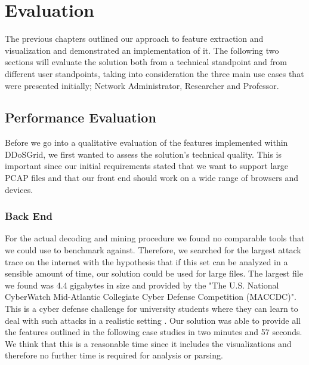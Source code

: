 




\chapter{Evaluation}

The previous chapters outlined our approach to feature extraction and visualization and demonstrated an implementation of it. The following two sections will evaluate the solution both from a technical standpoint and from different user standpoints, taking into consideration the three main use cases that were presented initially; Network Administrator, Researcher and Professor.
\section{Performance Evaluation}
Before we go into a qualitative evaluation of the features implemented within DDoSGrid, we first wanted to assess the solution's technical quality. This is important since our initial requirements stated that we want to support large PCAP files and that our front end should work on a wide range of browsers and devices.
\subsection{Back End}
For the actual decoding and mining procedure we found no comparable tools that we could use to benchmark against. Therefore, we searched for the largest attack trace on the internet with the hypothesis that if this set can be analyzed in a sensible amount of time, our solution could be used for large files. The largest file we found was 4.4 gigabytes in size and provided by the "The U.S. National CyberWatch Mid-Atlantic Collegiate Cyber Defense Competition (MACCDC)". This is a cyber defense challenge for university students where they can learn to deal with such attacks in a realistic setting \cite{maccdc}.
Our solution was able to provide all the features outlined in the following case studies in two minutes and 57 seconds. We think that this is a reasonable time since it includes the visualizations and therefore no further time is required for analysis or parsing.
